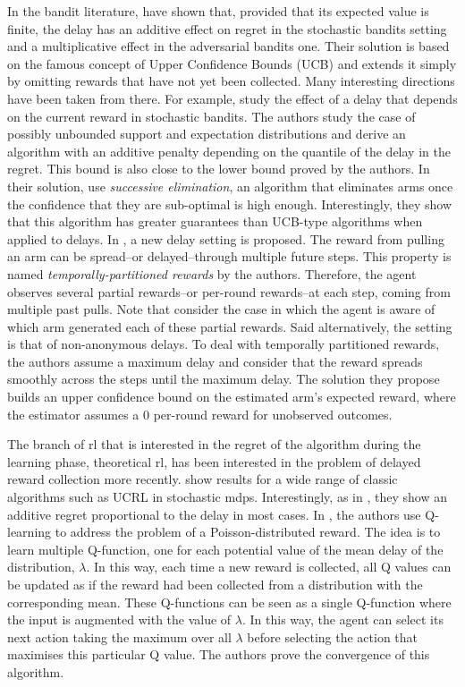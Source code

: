 In the bandit literature, \cite{joulani2013online} have shown that, provided that its expected value is finite, the delay has an additive effect on regret in the stochastic bandits setting and a multiplicative effect in the adversarial bandits one.
Their solution is based on the famous concept of Upper Confidence Bounds (UCB) \cite{auer2002finite} and extends it simply by omitting rewards that have not yet been collected.
Many interesting directions have been taken from there. 
For example, \cite{lancewicki2021stochastic} study the effect of a delay that depends on the current reward in stochastic bandits. 
The authors study the case of possibly unbounded support and expectation distributions and derive an algorithm with an additive penalty depending on the quantile of the delay in the regret. 
This bound is also close to the lower bound proved by the authors. 
In their solution, \cite{lancewicki2021stochastic} use \emph{successive elimination}, an algorithm that eliminates arms once the confidence that they are sub-optimal is high enough. Interestingly, they show that this algorithm has greater guarantees than UCB-type algorithms when applied to delays. 
In \cite{romano2022multi}, a new delay setting is proposed.
The reward from pulling an arm can be spread--or delayed--through multiple future steps. 
This property is named \emph{temporally-partitioned rewards} by the authors.
Therefore, the agent observes several partial rewards--or per-round rewards--at each step, coming from multiple past pulls. 
Note that \cite{romano2022multi} consider the case in which the agent is aware of which arm generated each of these partial rewards. 
Said alternatively, the setting is that of non-anonymous delays.
To deal with temporally partitioned rewards, the authors assume a maximum delay and consider that the reward spreads smoothly across the steps until the maximum delay. 
The solution they propose builds an upper confidence bound on the estimated arm's expected reward, where the estimator assumes a 0 per-round reward for unobserved outcomes. 


The branch of \gls{rl} that is interested in the regret of the algorithm during the learning phase, theoretical \gls{rl}, has been interested in the problem of delayed reward collection more recently. 
\cite{howson2021delayed} show results for a wide range of classic algorithms such as UCRL \cite{auer2008near} in stochastic \glspl{mdp}. 
Interestingly, as in \cite{joulani2013online}, they show an additive regret proportional to the delay in most cases. 
In \cite{campbell2016multiple}, the authors use Q-learning to address the problem of a Poisson-distributed reward. 
The idea is to learn multiple Q-function, one for each potential value of the mean delay of the distribution, $\lambda$. 
In this way, each time a new reward is collected, all Q values can be updated as if the reward had been collected from a distribution with the corresponding mean. 
These Q-functions can be seen as a single Q-function where the input is augmented with the value of $\lambda$. 
In this way, the agent can select its next action taking the maximum over all $\lambda$ before selecting the action that maximises this particular Q value. 
The authors prove the convergence of this algorithm. 


